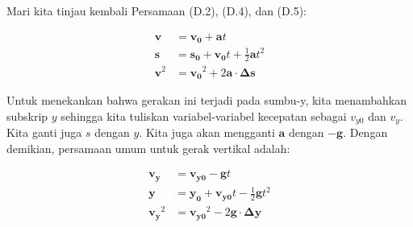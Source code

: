 \documentclass[12pt, a4paper]{article}\usepackage[utf8]{inputenc}
\theoremstyle{plain}
\theoremstyle{plain}
\numberwithin{equation}{section}
\theoremstyle{definition}
\begin{document}
	Mari kita tinjau kembali Persamaan (D.2), (D.4), dan (D.5):
	
	\vspace{-1.5em}
	\begin{align*}
		\boldsymbol{v} &= \boldsymbol{v_0} + \boldsymbol{a} t \tag{D.2}\\
		\boldsymbol{s} &= \boldsymbol{s_0} + \boldsymbol{v_0} t + \frac{1}{2} \boldsymbol{a} t^2 \tag{D.4}\\
		\boldsymbol{v}^2 &= \boldsymbol{v_0}^2 + 2 \boldsymbol{a} \cdot \boldsymbol{\Delta s} \tag{D.5}
	\end{align*}
	
	Untuk menekankan bahwa gerakan ini terjadi pada sumbu-y, kita menambahkan subskrip $y$ sehingga kita tuliskan variabel-variabel kecepatan sebagai $v_{y0}$ dan $v_y$. Kita ganti juga $s$ dengan $y$. Kita juga akan mengganti $\boldsymbol{a}$ dengan $-\boldsymbol{g}$. Dengan demikian, persamaan umum untuk gerak vertikal adalah:
	
	\vspace{-1.5em}
	\begin{align*}
		\boldsymbol{v_y} &= \boldsymbol{v_{y0}} - \boldsymbol{g} t \tag{D.2'}\\
		\boldsymbol{y} &= \boldsymbol{y_0} + \boldsymbol{v_{y0}} t - \frac{1}{2} \boldsymbol{g} t^2 \tag{D.4'}\\
		\boldsymbol{v_y}^2 &= \boldsymbol{v_{y0}}^2 - 2 \boldsymbol{g} \cdot \boldsymbol{\Delta y} \tag{D.5'}
	\end{align*}
	
\end{document}
